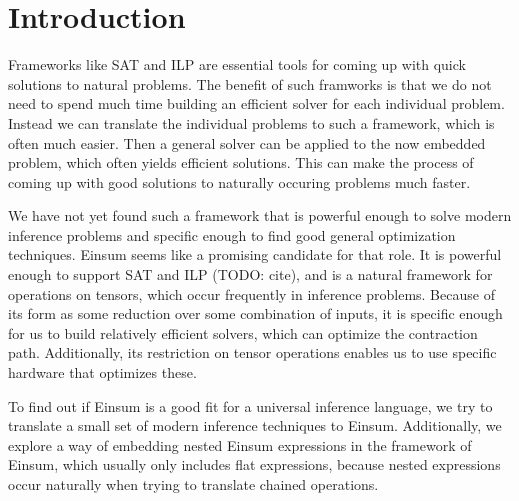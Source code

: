 \chapter{Introduction}


Frameworks like SAT and ILP are essential tools for coming up with quick solutions to natural problems.
The benefit of such framworks is that we do not need to spend much time building an efficient solver for each individual problem.
Instead we can translate the individual problems to such a framework, which is often much easier.
Then a general solver can be applied to the now embedded problem, which often yields efficient solutions.
This can make the process of coming up with good solutions to naturally occuring problems much faster.

We have not yet found such a framework that is powerful enough to solve modern inference problems
and specific enough to find good general optimization techniques.
Einsum seems like a promising candidate for that role.
It is powerful enough to support SAT and ILP (TODO: cite), and is a natural framework for operations on tensors, which occur frequently in inference problems.
Because of its form as some reduction over some combination of inputs, it is specific enough for us to build relatively efficient solvers, which can optimize the contraction path.
Additionally, its restriction on tensor operations enables us to use specific hardware that optimizes these.

To find out if Einsum is a good fit for a universal inference language,
we try to translate a small set of modern inference techniques to Einsum.
Additionally, we explore a way of embedding nested Einsum expressions in the framework of Einsum,
which usually only includes flat expressions,
because nested expressions occur naturally when trying to translate chained operations.